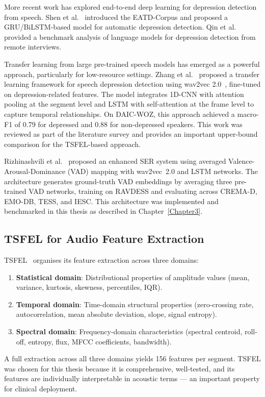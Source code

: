 More recent work has explored end-to-end deep learning for depression detection from speech. Shen et al.~\cite{Shen2022} introduced the EATD-Corpus and proposed a GRU/BiLSTM-based model for automatic depression detection. Qin et al.~\cite{Qin2024} provided a benchmark analysis of language models for depression detection from remote interviews.

Transfer learning from large pre-trained speech models has emerged as a powerful approach, particularly for low-resource settings. Zhang et al.~\cite{Zhang2023} proposed a transfer learning framework for speech depression detection using wav2vec 2.0~\cite{Baevski2020}, fine-tuned on depression-related features. The model integrates 1D-CNN with attention pooling at the segment level and LSTM with self-attention at the frame level to capture temporal relationships. On DAIC-WOZ, this approach achieved a macro-F1 of 0.79 for depressed and 0.88 for non-depressed speakers. This work was reviewed as part of the literature survey and provides an important upper-bound comparison for the TSFEL-based approach.

Rizhinashvili et al.~\cite{Rizhinashvili2024} proposed an enhanced SER system using averaged Valence-Arousal-Dominance (VAD) mapping with wav2vec~2.0 and LSTM networks. The architecture generates ground-truth VAD embeddings by averaging three pre-trained VAD networks, training on RAVDESS and evaluating across CREMA-D, EMO-DB, TESS, and IESC. This architecture was implemented and benchmarked in this thesis as described in Chapter~\ref{Chapter3}.

\subsection{TSFEL for Audio Feature Extraction}

TSFEL~\cite{TSFEL2020} organises its feature extraction across three domains:
\begin{enumerate}
    \item \textbf{Statistical domain}: Distributional properties of amplitude values (mean, variance, kurtosis, skewness, percentiles, IQR).
    \item \textbf{Temporal domain}: Time-domain structural properties (zero-crossing rate, autocorrelation, mean absolute deviation, slope, signal entropy).
    \item \textbf{Spectral domain}: Frequency-domain characteristics (spectral centroid, roll-off, entropy, flux, MFCC coefficients, bandwidth).
\end{enumerate}
A full extraction across all three domains yields 156 features per segment. TSFEL was chosen for this thesis because it is comprehensive, well-tested, and its features are individually interpretable in acoustic terms — an important property for clinical deployment.

